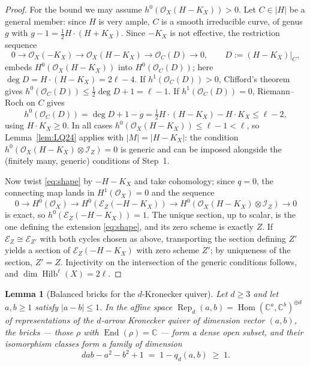 \documentclass{amsart}
\newtheorem{lemma}[theorem]{Lemma}
\theoremstyle{definition}
\newcommand{\OO}{\mathcal{O}}
\newcommand{\EE}{\mathcal{E}}
\newcommand{\II}{\mathcal{I}}
\newcommand{\CC}{\mathbb{C}}
\newcommand{\Hilb}{\operatorname{Hilb}}
\newcommand{\Hom}{\operatorname{Hom}}
\newcommand{\End}{\operatorname{End}}
\newcommand{\Rep}{\operatorname{Rep}}
\newcommand{\len}{\ell}
\begin{document}
\begin{proof}
For the bound we may assume $h^0(\OO_X(H-K_X))>0$. Let $C\in|H|$ be a general member: since $H$ is very ample, $C$ is a smooth irreducible curve, of genus $g$ with $g-1=\tfrac12H\cdot(H+K_X)$. Since $-K_X$ is not effective, the restriction sequence
\[
0\to\OO_X(-K_X)\to\OO_X(H-K_X)\to\OO_C(D)\to0,\qquad D:=(H-K_X)|_C ,
\]
embeds $H^0(\OO_X(H-K_X))$ into $H^0(\OO_C(D))$; here $\deg D=H\cdot(H-K_X)=2\len-4$. If $h^1(\OO_C(D))>0$, Clifford's theorem gives $h^0(\OO_C(D))\le\tfrac12\deg D+1=\len-1$. If $h^1(\OO_C(D))=0$, Riemann--Roch on $C$ gives
\[
h^0(\OO_C(D))=\deg D+1-g=\tfrac12H\cdot(H-K_X)-H\cdot K_X\le\len-2 ,
\]
using $H\cdot K_X\ge0$. In all cases $h^0(\OO_X(H-K_X))\le\len-1<\len$, so Lemma~\ref{lem:LQ24} applies with $|M|=|H-K_X|$: the condition $h^0(\OO_X(H-K_X)\otimes\II_Z)=0$ is generic and can be imposed alongside the (finitely many, generic) conditions of Step~1.

Now twist \eqref{eq:shape} by $-H-K_X$ and take cohomology; since $q=0$, the connecting map lands in $H^1(\OO_X)=0$ and the sequence
\[
0\to H^0(\OO_X)\to H^0(\EE_Z(-H-K_X))\to H^0(\OO_X(H-K_X)\otimes\II_Z)\to 0
\]
is exact,
so $h^0(\EE_Z(-H-K_X))=1$. The unique section, up to scalar, is the one defining the extension \eqref{eq:shape}, and its zero scheme is exactly $Z$. If $\EE_Z\cong\EE_{Z'}$ with both cycles chosen as above, transporting the section defining $Z'$ yields a section of $\EE_Z(-H-K_X)$ with zero scheme $Z'$; by uniqueness of the section, $Z'=Z$. Injectivity on the intersection of the generic conditions follows, and $\dim\Hilb^{\len}(X)=2\len$.
\end{proof}

\begin{lemma}[Balanced bricks for the $d$-Kronecker quiver]\label{lem:bricks}
Let $d\ge3$ and let $a,b\ge1$ satisfy $|a-b|\le1$. In the affine space $\Rep_d(a,b)=\Hom(\CC^a,\CC^b)^{\oplus d}$ of representations of the $d$-arrow Kronecker quiver of dimension vector $(a,b)$, the bricks --- those $\rho$ with $\End(\rho)=\CC$ --- form a dense open subset, and their isomorphism classes form a family of dimension
\[
dab-a^2-b^2+1\;=\;1-q_d(a,b)\;\ge\;1 .
\]
\end{lemma}
\end{document}
